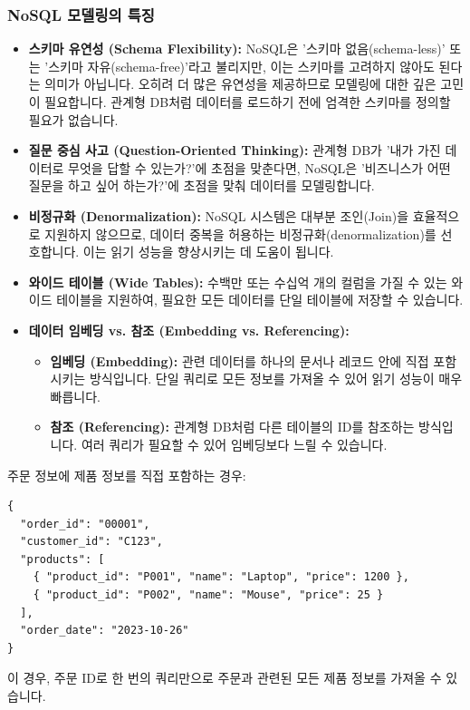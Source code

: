 \documentclass[11pt,a4paper]{article}
\theoremstyle{definition}
\begin{document}
\subsubsection{NoSQL 모델링의 특징}
\begin{itemize}
    \item \textbf{스키마 유연성 (Schema Flexibility):} NoSQL은 '스키마 없음(schema-less)' 또는 '스키마 자유(schema-free)'라고 불리지만, 이는 스키마를 고려하지 않아도 된다는 의미가 아닙니다. 오히려 더 많은 유연성을 제공하므로 모델링에 대한 깊은 고민이 필요합니다. 관계형 DB처럼 데이터를 로드하기 전에 엄격한 스키마를 정의할 필요가 없습니다.
    \item \textbf{질문 중심 사고 (Question-Oriented Thinking):} 관계형 DB가 '내가 가진 데이터로 무엇을 답할 수 있는가?'에 초점을 맞춘다면, NoSQL은 '비즈니스가 어떤 질문을 하고 싶어 하는가?'에 초점을 맞춰 데이터를 모델링합니다.
    \item \textbf{비정규화 (Denormalization):} NoSQL 시스템은 대부분 조인(Join)을 효율적으로 지원하지 않으므로, 데이터 중복을 허용하는 비정규화(denormalization)를 선호합니다. 이는 읽기 성능을 향상시키는 데 도움이 됩니다.
    \item \textbf{와이드 테이블 (Wide Tables):} 수백만 또는 수십억 개의 컬럼을 가질 수 있는 와이드 테이블을 지원하여, 필요한 모든 데이터를 단일 테이블에 저장할 수 있습니다.
    \item \textbf{데이터 임베딩 vs. 참조 (Embedding vs. Referencing):}
    \begin{itemize}
        \item \textbf{임베딩 (Embedding):} 관련 데이터를 하나의 문서나 레코드 안에 직접 포함시키는 방식입니다. 단일 쿼리로 모든 정보를 가져올 수 있어 읽기 성능이 매우 빠릅니다.
        \item \textbf{참조 (Referencing):} 관계형 DB처럼 다른 테이블의 ID를 참조하는 방식입니다. 여러 쿼리가 필요할 수 있어 임베딩보다 느릴 수 있습니다.
    \end{itemize}
\end{itemize}

\begin{tcolorbox}[example, title=데이터 임베딩 예시]
주문 정보에 제품 정보를 직접 포함하는 경우:
\begin{verbatim}
{
  "order_id": "00001",
  "customer_id": "C123",
  "products": [
    { "product_id": "P001", "name": "Laptop", "price": 1200 },
    { "product_id": "P002", "name": "Mouse", "price": 25 }
  ],
  "order_date": "2023-10-26"
}
\end{verbatim}
이 경우, 주문 ID로 한 번의 쿼리만으로 주문과 관련된 모든 제품 정보를 가져올 수 있습니다.
\end{tcolorbox}
\end{document}

